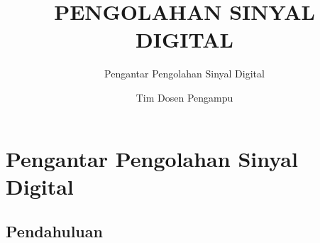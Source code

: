 \documentclass[pdflatex,compress]{beamer}
\title{PENGOLAHAN SINYAL DIGITAL}
\subtitle{Pengantar Pengolahan Sinyal Digital}
\author{Tim Dosen Pengampu}
\begin{document}
\maketitle

\section{Pengantar Pengolahan Sinyal Digital}

\subsection{Pendahuluan}
\end{document}
